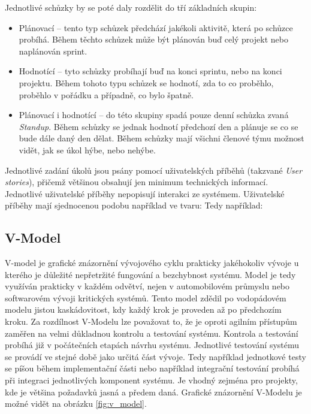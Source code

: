 \documentclass[czech,master,public,dept460,male,cpdeclaration,oneside]{diploma}
\begin{document}
Jednotlivé schůzky by se poté daly rozdělit do tří základních skupin:

\begin{itemize}
\item Plánovací -- tento typ schůzek předchází jakékoli aktivitě, která po schůzce probíhá. Během těchto schůzek může být plánován buď celý projekt nebo naplánován sprint.
\item Hodnotící -- tyto schůzky probíhají buď na konci sprintu, nebo na konci projektu. Během tohoto typu schůzek se hodnotí, zda to co proběhlo, proběhlo v pořádku a případně, co bylo špatně. 
\item Plánovací i hodnotící -- do této skupiny spadá pouze denní schůzka zvaná \textit{Standup}. Během schůzky se jednak hodnotí předchozí den a plánuje se co se bude dále daný den dělat. Během schůzky mají všichni členové týmu možnost vidět, jak se úkol hýbe, nebo nehýbe.
\end{itemize}


Jednotlivé zadání úkolů jsou psány pomocí uživatelských příběhů (takzvané \textit{User stories}), přičemž většinou obsahují jen minimum technických informací. Jednotlivé uživatelské příběhy nepopisují interakci ze systémem. Uživatelské příběhy mají  sjednocenou podobu například ve tvaru:  Tedy například:  \cite{ref:scrum_myslin_us}

\subsection{V-Model}
V-model je grafické znázornění vývojového cyklu prakticky jakéhokoliv vývoje u kterého je důležité nepřetržité fungování a bezchybnost systému. Model je tedy využíván prakticky v každém odvětví, nejen v automobilovém průmyslu nebo softwarovém vývoji kritických systémů. Tento model zdědil po vodopádovém modelu jistou kaskádovitost, kdy každý krok je proveden až po předchozím kroku. Za rozdílnost V-Modelu lze považovat to, že je oproti agilním přístupům zaměřen na velmi důkladnou kontrolu a testování systému. Kontrola a testování probíhá již v počátečních etapách návrhu systému. Jednotlivé testování systému se provádí ve stejné době jako určitá část vývoje. Tedy například jednotkové testy se píšou během implementační části nebo například integrační testování probíhá při integraci jednotlivých komponent systému. Je vhodný zejména pro projekty, kde je většina požadavků jasná a předem daná. Grafické znázornění V-Modelu je možné vidět na obrázku \ref{fig:v_model}.
\end{document}
